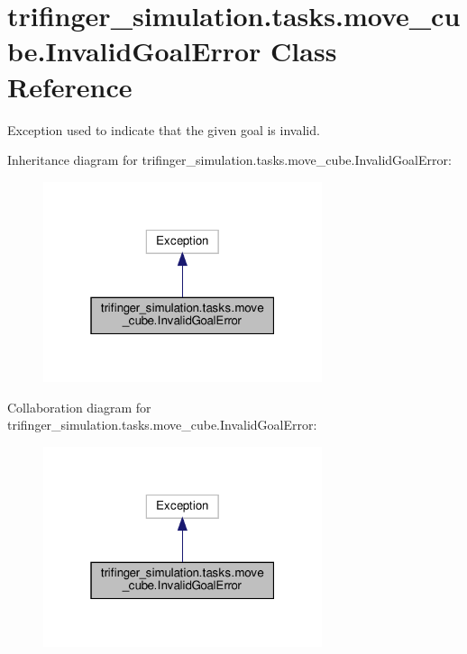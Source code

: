 \hypertarget{classtrifinger__simulation_1_1tasks_1_1move__cube_1_1InvalidGoalError}{}\section{trifinger\+\_\+simulation.\+tasks.\+move\+\_\+cube.\+Invalid\+Goal\+Error Class Reference}
\label{classtrifinger__simulation_1_1tasks_1_1move__cube_1_1InvalidGoalError}


Exception used to indicate that the given goal is invalid.  




Inheritance diagram for trifinger\+\_\+simulation.\+tasks.\+move\+\_\+cube.\+Invalid\+Goal\+Error\+:
\nopagebreak
\begin{figure}[H]
\begin{center}
\leavevmode
\includegraphics[width=232pt]{classtrifinger__simulation_1_1tasks_1_1move__cube_1_1InvalidGoalError__inherit__graph}
\end{center}
\end{figure}


Collaboration diagram for trifinger\+\_\+simulation.\+tasks.\+move\+\_\+cube.\+Invalid\+Goal\+Error\+:
\nopagebreak
\begin{figure}[H]
\begin{center}
\leavevmode
\includegraphics[width=232pt]{classtrifinger__simulation_1_1tasks_1_1move__cube_1_1InvalidGoalError__coll__graph}
\end{center}
\end{figure}
